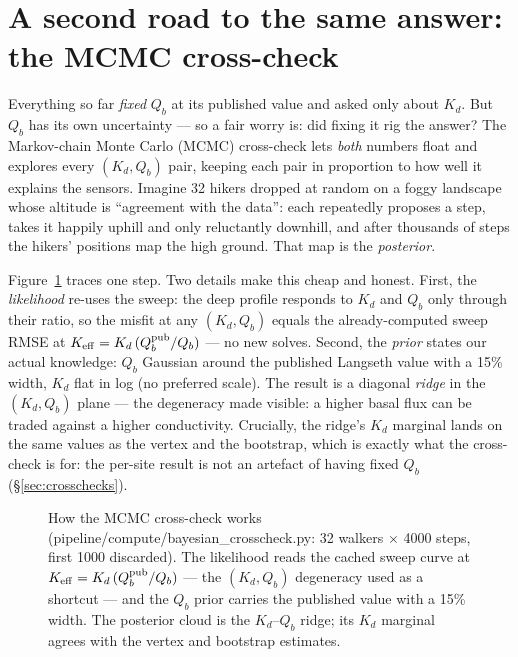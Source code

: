 \documentclass[11pt]{report}
\newcommand{\code}[1]{{\ttfamily\small #1}}
\begin{document}
\section{A second road to the same answer: the MCMC
cross-check}\label{sec:mcmczero}

\begin{plain}
Everything so far \emph{fixed} $Q_b$ at its published value and asked only
about $K_d$. But $Q_b$ has its own uncertainty --- so a fair worry is: did
fixing it rig the answer? The Markov-chain Monte Carlo (MCMC) cross-check
lets \emph{both} numbers float and explores every $(K_d, Q_b)$ pair, keeping
each pair in proportion to how well it explains the sensors. Imagine 32
hikers dropped at random on a foggy landscape whose altitude is ``agreement
with the data'': each repeatedly proposes a step, takes it happily uphill and
only reluctantly downhill, and after thousands of steps the hikers' positions
map the high ground. That map is the \emph{posterior}.
\end{plain}

Figure~\ref{fig:mcmcflow} traces one step. Two details make this cheap and
honest. First, the \emph{likelihood} re-uses the sweep: the deep profile
responds to $K_d$ and $Q_b$ only through their ratio, so the misfit at any
$(K_d, Q_b)$ equals the already-computed sweep RMSE at
$K_{\rm eff} = K_d\,(Q_b^{\rm pub}/Q_b)$ --- no new solves. Second, the
\emph{prior} states our actual knowledge: $Q_b$ Gaussian around the published
Langseth value with a 15\% width, $K_d$ flat in log (no preferred scale).
The result is a diagonal \emph{ridge} in the $(K_d, Q_b)$ plane --- the
degeneracy made visible: a higher basal flux can be traded against a higher
conductivity. Crucially, the ridge's $K_d$ marginal lands on the same values
as the vertex and the bootstrap, which is exactly what the cross-check is
for: the per-site result is not an artefact of having fixed $Q_b$
(\S\ref{sec:crosschecks}).

\begin{figure}[htbp]\centering

\caption{How the MCMC cross-check works
(\code{pipeline/compute/bayesian\_crosscheck.py}: 32 walkers $\times$ 4000
steps, first 1000 discarded). The likelihood reads the cached sweep curve at
$K_{\rm eff}=K_d\,(Q_b^{\rm pub}/Q_b)$ --- the $(K_d,Q_b)$ degeneracy used as
a shortcut --- and the $Q_b$ prior carries the published value with a 15\%
width. The posterior cloud is the $K_d$--$Q_b$ ridge; its $K_d$ marginal
agrees with the vertex and bootstrap estimates.}
\label{fig:mcmcflow}
\end{figure}
\end{document}
